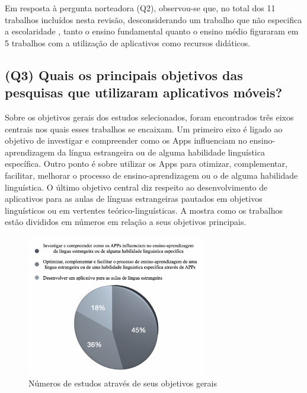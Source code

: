 \documentclass{textolivre}
\begin{document}
Em resposta à pergunta norteadora (Q2), observou-se que, no total dos 11 trabalhos incluídos nesta revisão, desconsiderando um trabalho que não especifica a escolaridade \cite{almeida2018}, tanto o ensino fundamental \cite{censi2017, nascimento2017, montes2018, ximena2017, lu2014} quanto o ensino médio \cite{rodrigues2014, magali2017, macias2016, redondo2017, liz2015} figuraram em 5 trabalhos com a utilização de aplicativos como recursos didáticos.

\subsection{(Q3) Quais os principais objetivos das pesquisas que utilizaram aplicativos móveis?}
Sobre os objetivos gerais dos estudos selecionados, foram encontrados três eixos centrais nos quais esses trabalhos se encaixam. Um primeiro eixo é ligado ao objetivo de investigar e compreender como os Apps influenciam no ensino-aprendizagem da língua estrangeira ou de alguma habilidade linguística específica. Outro ponto é sobre utilizar os Apps para otimizar, complementar, facilitar, melhorar o processo de ensino-aprendizagem ou o de alguma habilidade linguística. O último objetivo central diz respeito ao desenvolvimento de aplicativos para as aulas de línguas estrangeiras pautados em objetivos linguísticos ou em vertentes teórico-linguísticas. A  mostra como os trabalhos estão divididos em números em relação a seus objetivos principais. 

\begin{figure}[htbp]
 \centering
 \includegraphics[width=0.7\textwidth]{fig6.png}
 \caption{Números de estudos através de seus objetivos gerais}
 \label{fig6}
\end{figure}
\end{document}
